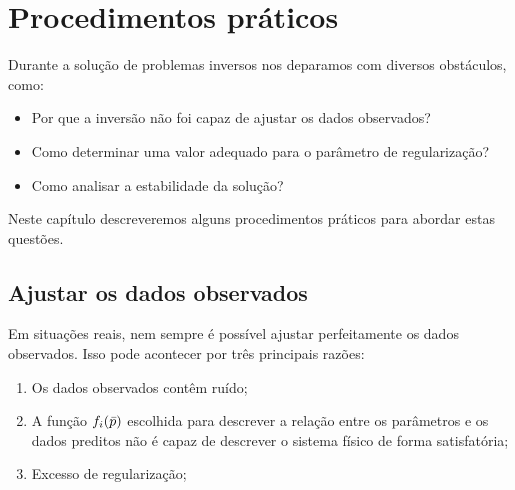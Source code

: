 \chapter{Procedimentos práticos}
\label{chap:proc_praticos}

Durante a solução de problemas inversos nos deparamos com diversos obstáculos, 
como:

\begin{itemize}
\item Por que a inversão não foi capaz de ajustar os dados observados?
\item Como determinar uma valor adequado para o parâmetro de regularização?
\item Como analisar a estabilidade da solução?
\end{itemize}

\noindent Neste capítulo descreveremos alguns procedimentos práticos para abordar
estas questões.

\section{Ajustar os dados observados}

Em situações reais, nem sempre é possível ajustar perfeitamente os dados observados.
Isso pode acontecer por três principais razões:

\begin{enumerate}
\item Os dados observados contêm ruído;
\item A função $f_i(\bar{p})$ escolhida para descrever a relação entre os
parâmetros e os dados preditos não é capaz de descrever o sistema físico
de forma satisfatória;
\item Excesso de regularização;
\end{enumerate}

